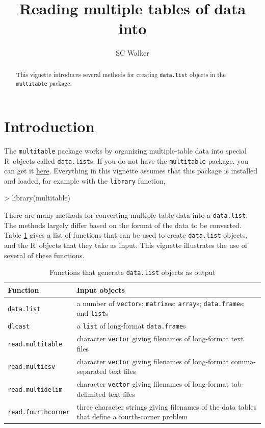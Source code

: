 \documentclass{article}
\title{Reading multiple tables of data into \R}
\author{SC Walker}
\newcommand{\R}{{\sf R}}
\newcommand{\code}[1]{\texttt{#1}}
\numberwithin{exercise}{section}
\begin{document}
\maketitle
\tableofcontents

\begin{abstract}
This vignette introduces several methods for creating \code{data.list} objects in the \code{multitable} package.
\end{abstract}



\section{Introduction}

The \code{multitable} package works by organizing multiple-table data into special \R\ objects called \code{data.list}s.  If you do not have the \code{multitable} package, you can get it \href{https://r-forge.r-project.org/R/?group_id=1171}{here}.  Everything in this vignette assumes that this package is installed and loaded, for example with the \code{library} function,
\begin{Schunk}
\begin{Sinput}
> library(multitable)
\end{Sinput}
\end{Schunk}

There are many methods for converting multiple-table data into a \code{data.list}.  The methods largely differ based on the format of the data to be converted.  Table \ref{tab:functions} gives a list of functions that can be used to create \code{data.list} objects, and the \R\ objects that they take as input.  This vignette illustrates the use of several of these functions.

\begin{table}
\caption{Functions that generate \code{data.list} objects as output}
\begin{center}
\begin{tabular}{p{3cm}p{8cm}}
\hline
Function & Input objects \\
\hline
\code{data.list} & a number of \code{vector}s; \code{matrix}es; \code{array}s; \code{data.frame}s; and \code{list}s \\
\code{dlcast} & a \code{list} of long-format \code{data.frame}s \\
\code{read.multitable} & character \code{vector} giving filenames of long-format text files \\
\code{read.multicsv} & character \code{vector} giving filenames of long-format comma-separated text files \\
\code{read.multidelim} & character \code{vector} giving filenames of long-format tab-delimited text files \\
\code{read.fourthcorner} & three character strings giving filenames of the data tables that define a fourth-corner problem \\
\hline
\end{tabular}
\end{center}
\label{tab:functions}
\end{table}
\end{document}
